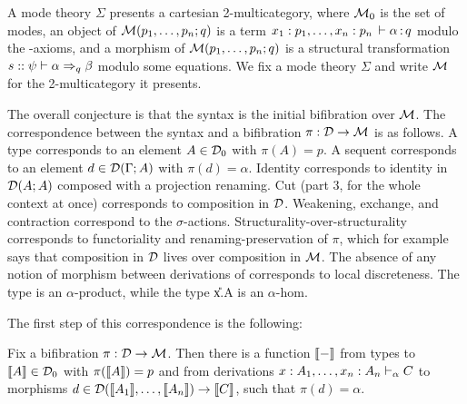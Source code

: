 A mode theory $\Sigma$ presents a cartesian 2-multicategory, where
$\mathcal{M}_0$ is the set of modes, an object of $\mathcal{M}(p_1,\ldots,p_n;q)$ is a
term $x_1:p_1,\ldots,x_n:p_n \, \vdash \alpha \, \mathit{:} \, q$ modulo the \deq-axioms,
and a morphism of $\mathcal{M}(p_1,\ldots,p_n;q)$ is a structural transformation
$s :: \psi \vdash \alpha \Rightarrow_{q} \beta$ modulo some equations.  We fix a
mode theory $\Sigma$ and write $\mathcal{M}$ for the 2-multicategory it presents.

The overall conjecture is that the syntax is the initial bifibration
over $\mathcal{M}$.  The correspondence between the syntax and a bifibration $\pi
: \mathcal{D} \to \mathcal{M}$ is as follows.  A type  corresponds to an
element $A \in \mathcal{D}_0$ with $\pi(A) = p$.  A sequent
 corresponds to an element $d \in \mathcal{D}(\Gamma;A)$
with $\pi(d) = \alpha$.  Identity  corresponds to
identity in $\mathcal{D}(A;A)$ composed with a projection renaming.  Cut (part 3,
for the whole context at once) corresponds to composition in $\mathcal{D}$.
Weakening, exchange, and contraction correspond to the $\sigma$-actions.
Structurality-over-structurality corresponds to functoriality and
renaming-preservation of $\pi$, which for example says that composition
in $\mathcal{D}$ lives over composition in $\mathcal{M}$.  The absence of any notion of
morphism between derivations of  corresponds to
local discreteness.  The type \F{\alpha}{\Delta} is an $\alpha$-product,
while the type \U{x.\alpha}{\Delta}{A} is an $\alpha$-hom.

The first step of this correspondence is the following:

\begin{theorem}
Fix a bifibration $\pi : \mathcal{D} \to \mathcal{M}$.  Then there is a function $\llbracket -
\rrbracket$ from types  to $\llbracket A \rrbracket \in \mathcal{D}_0$ with $\pi(\llbracket
A \rrbracket) = p$ and from derivations $x:A_1, \ldots,
  x_n:A_n \vdash_{\alpha} C$ to morphisms $d \in \mathcal{D}(\llbracket A_1 \rrbracket, \dots, \llbracket
A_n \rrbracket) \to \llbracket C \rrbracket$, such that $\pi(d) = \alpha$.
\end{theorem}

